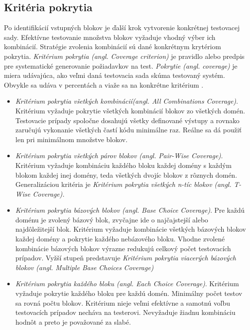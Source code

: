 \subsection*{Kritéria pokrytia}
Po identifikácií vstupných blokov je ďalší krok vytvorenie konkrétnej testovacej sady. Efektívne testovanie množstva blokov vyžaduje vhodný výber ich kombinácií. Stratégie zvolenia kombinácií sú dané konkrétnym krytériom pokrytia. \textit{Kritérium pokrytia (angl. Coverage criterion)} je pravidlo alebo predpis pre systematické generovanie požiadavkov na test. \textit{Pokrytie (angl. coverage)} je miera udávajúca, ako veľmi daná testovacia sada skúma testovaný systém. Obvykle sa udáva v percentách a viaže sa na konkrétne kritérium \cite{Ist}.     
 \begin{itemize}
 	\item{ \textit{Kritérium pokrytia všetkých kombinácií(angl. All Combinations Coverage)}. Kritérium vyžaduje pokrytie všetkých kombinácií blokov zo všetkých domén. Testovacie prípady spoločne dosahujú všetky definované výstupy a rovnako zaručujú vykonanie všetkých častí kódu minimálne raz. Reálne sa dá použiť len pri minimálnom množstve blokov.
 		}
 	\item{ \textit{Kritérium pokrytia všetkých párov blokov (angl.  Pair-Wise Coverage)}. Kritérium vyžaduje kombináciu každého bloku každej domény s každým blokom každej inej domény, teda všetkých dvojíc blokov z rôznych domén. Generalizáciou kritéria je \textit{Kritérium pokrytia všetkých n-tíc blokov (angl. T-Wise Coverage).}  
 	}
 	\item{ \textit{Kritérium pokrytia bázových blokov (angl. Base Choice Coverage)}. Pre každú doménu je zvolený bázový blok,  zvyčajne ide o najčajstejší alebo najdôležitejší blok. Kritérium vyžaduje kombinácie všetkých bázových blokov každej domény a pokrytie každého nebázového bloku. Vhodne zvolené kombinácie bázových blokov výrazne redukujú celkový počet testovacích prípadov. Vyžší stupeň predstavuje \textit{Kritérium pokrytia viacerých bázových blokov (angl. Multiple Base Choices Coverage)} 
 	} 	
 	\item{ \textit{Kritérium pokrytia každého bloku (angl. Each Choice Coverage)}. Kritérium vyžaduje pokrytie každého bloku pre každú domén. Minimálny počet testov sa rovná počtu blokov. Kritérium nieje veľmi efektívne a samotnú voľbu testovacích prípadov necháva na testerovi. Nevyžaduje žiadnu kombináciu hodnôt a preto je považované za slabé.
 	}
 \end{itemize}


